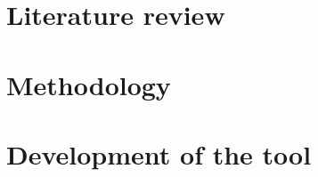 	
\raggedbottom													%





\frontmatter													%


\cleardoublepage												%

\cleardoublepage

\cleardoublepage


\tableofcontents*												%


\mainmatter														%




\part{Literature review}





\part{Methodology}




\part{Development of the tool}




